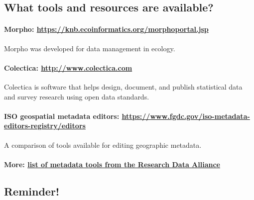 \subsection{What tools and resources are
available?}\label{what-tools-and-resources-are-available}

\paragraph{\texorpdfstring{Morpho:
\url{https://knb.ecoinformatics.org/morphoportal.jsp}}{Morpho: https://knb.ecoinformatics.org/morphoportal.jsp}}\label{morpho-httpsknb.ecoinformatics.orgmorphoportal.jsp}

Morpho was developed for data management in ecology.

\paragraph{\texorpdfstring{Colectica:
\href{http://www.colectica.com/}{http://www.colectica.com}}{Colectica: http://www.colectica.com}}\label{colectica-httpwww.colectica.com}

Colectica is software that helps design, document, and publish
statistical data and survey research using open data standards.

\paragraph{\texorpdfstring{ISO geospatial metadata editors:
\url{https://www.fgdc.gov/iso-metadata-editors-registry/editors}}{ISO geospatial metadata editors: https://www.fgdc.gov/iso-metadata-editors-registry/editors}}\label{iso-geospatial-metadata-editors-httpswww.fgdc.goviso-metadata-editors-registryeditors}

A comparison of tools available for editing geographic metadata.

\paragraph{\texorpdfstring{More:
\href{http://rd-alliance.github.io/metadata-directory/tools}{list of
metadata tools from the Research Data
Alliance}}{More: list of metadata tools from the Research Data Alliance}}\label{more-list-of-metadata-tools-from-the-research-data-alliance}

\subsection{Reminder!}\label{reminder}

